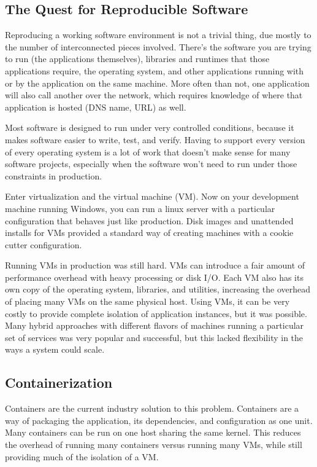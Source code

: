 \documentclass[11pt,twoside]{article}
\begin{document}
\subsection{The Quest for Reproducible Software}

Reproducing a working software environment is not a trivial thing, due
mostly to the number of interconnected pieces involved.  There's the software
you are trying to run (the applications themselves), libraries and runtimes that
those applications require, the operating system, and other applications running with
or by the application on the same machine. More often than not, one application
will also call another over the network, which requires knowledge of where that
application is hosted (DNS name, URL) as well.

Most software is designed to run under very controlled conditions, because
it makes software easier to write, test, and verify.  Having to support every version of every
operating system is a lot of work that doesn't make sense for many software
projects, especially when the software won't need to run under those constraints
in production.

Enter virtualization and the virtual machine (VM).  Now on your development machine running
Windows, you can run a linux server with a particular configuration that behaves just
like production.  Disk images and unattended installs for VMs provided a standard way of
creating machines with a cookie cutter configuration.

Running VMs in production was still hard.  VMs can introduce a fair amount of performance
overhead with heavy processing or disk I/O.  Each VM also has its own copy of the operating
system, libraries, and utilities, increasing the overhead of placing many VMs on the same
physical host.  Using VMs, it can be very costly to provide complete isolation of application
instances, but it was possible.  Many hybrid approaches with different flavors of machines running
a particular set of services was very popular and successful, but this lacked flexibility
in the ways a system could scale.

\subsection{Containerization}

Containers are the current industry solution to this problem.  Containers are a way of packaging
the application, its dependencies, and configuration as one unit.  Many containers can be
run on one host sharing the same kernel.  This reduces the overhead of running many containers
versus running many VMs, while still providing much of the isolation of a VM.
\end{document}
